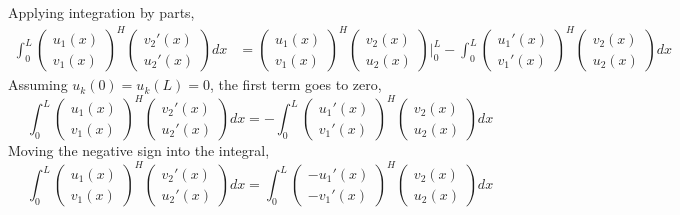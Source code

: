 \documentclass{article}
\begin{document}
Applying integration by parts,
\begin{align*}
  \int_0^L \begin{pmatrix}
    u_1(x) \\
    v_1(x)
  \end{pmatrix}^H \begin{pmatrix}
    v_2'(x) \\
    u_2'(x)
  \end{pmatrix} dx &= \begin{pmatrix}
    u_1(x) \\
    v_1(x)
  \end{pmatrix}^H \begin{pmatrix}
    v_2(x) \\
    u_2(x)
  \end{pmatrix} \Bigg\vert_0^L - \int_0^L \begin{pmatrix}
    u_1'(x) \\
    v_1'(x)
  \end{pmatrix}^H \begin{pmatrix}
    v_2(x) \\
    u_2(x)
  \end{pmatrix} dx
\end{align*}
Assuming $u_k(0) = u_k(L) = 0$, the first term goes to zero,
$$ \int_0^L \begin{pmatrix}
    u_1(x) \\
    v_1(x)
  \end{pmatrix}^H \begin{pmatrix}
    v_2'(x) \\
    u_2'(x)
  \end{pmatrix} dx = - \int_0^L \begin{pmatrix}
    u_1'(x) \\
    v_1'(x)
  \end{pmatrix}^H \begin{pmatrix}
    v_2(x) \\
    u_2(x)
  \end{pmatrix} dx $$
Moving the negative sign into the integral,
$$ \int_0^L \begin{pmatrix}
    u_1(x) \\
    v_1(x)
  \end{pmatrix}^H \begin{pmatrix}
    v_2'(x) \\
    u_2'(x)
  \end{pmatrix} dx = \int_0^L \begin{pmatrix}
    - u_1'(x) \\
    - v_1'(x)
  \end{pmatrix}^H \begin{pmatrix}
    v_2(x) \\
    u_2(x)
  \end{pmatrix} dx $$
\end{document}
